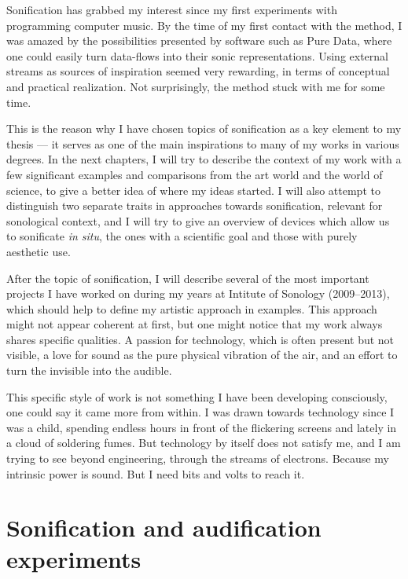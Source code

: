\documentclass[12pt,a4paper,oneside]{report}
\begin{document}
Sonification has grabbed my interest since my first experiments with programming computer music. By the time of my first contact with the method, I was amazed by the possibilities presented by software such as Pure Data, where one could easily turn data-flows into their sonic representations. Using external streams as sources of inspiration seemed very rewarding, in terms of conceptual and practical realization. Not surprisingly, the method stuck with me for some time.

This is the reason why I have chosen topics of sonification as a key element to my thesis --- it serves as one of the main inspirations to many of my works in various degrees. In the next chapters, I will try to describe the context of my work with a few significant examples and comparisons from the art world and the world of science, to give a better idea of where my ideas started. I will also attempt to distinguish two separate traits in approaches towards sonification, relevant for sonological context, and I will try to give an overview of devices which allow us to sonificate \textit{in situ}, the ones with a scientific goal and those with purely aesthetic use.

After the topic of sonification, I will describe several of the most important projects I have worked on during my years at Intitute of Sonology (2009--2013), which should help to define my artistic approach in examples. This approach might not appear coherent at first, but one might notice that my work always shares specific qualities. A passion for technology, which is often present but not visible, a love for sound as the pure physical vibration of the air, and an effort to turn the invisible into the audible.

This specific style of work is not something I have been developing consciously, one could say it came more from within. I was drawn towards technology since I was a child, spending endless hours in front of the flickering screens and lately in a cloud of soldering fumes. But technology by itself does not satisfy me, and I am trying to see beyond engineering, through the streams of electrons. Because my intrinsic power is sound. But I need bits and volts to reach it.


\chapter{Sonification and audification experiments}
\end{document}
